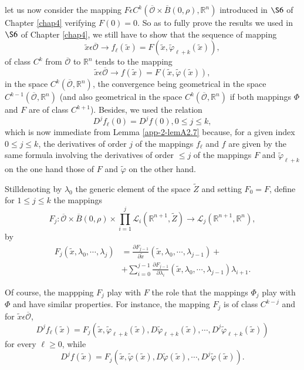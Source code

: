 let us now consider the mapping $F \epsilon C^{k}
(\overline{\mathscr{O}} \times \overline{B}(0, \rho), \mathbb{R}^{n})$
introduced in $\S 6$ of Chapter \ref{chap4} verifying $F(0) = 0$. So
as to fully prove the results we used in $\S 6$ of Chapter
\ref{chap4}, we still have to show that the sequence of mapping
$$
\widetilde{x} \epsilon \overline{\mathscr{O}} \to
f_{\ell}(\widetilde{x}) = F(\widetilde{x}, \widetilde{\varphi}_{\ell +
k}(\widetilde{x})),
$$
of class $C^{k}$ from $\overline{\mathscr{O}}$ to $\mathbb{R}^{n}$
tends to the mapping
$$
\widetilde{x} \epsilon \overline{\mathscr{O}} \to f(\widetilde{x}) =
F(\widetilde{x}, \widetilde{\varphi}(\widetilde{x})),
$$
in the space $C^{k}(\overline{\mathscr{O}}, \mathbb{R}^{n})$, the
convergence being geometrical in the space
$C^{k-1}(\overline{\mathscr{O}}, \mathbb{R}^{n})$ (and also
geometrical in the space $C^{k}(\overline{\mathscr{O}},
\mathbb{R}^{n})$ if both mappings $\Phi$ and $F$ are of class
$C^{k+1}$). Besides, we used the relation
$$
D^{j}f_{\ell}(0) = D^{j}f(0), 0 \leq j \leq k,
$$
which is now immediate from Lemma \ref{app-2-lemA2.7} because, for a given index $0
\leq j \leq k$, the derivatives of order $j$ of the mappings $f_{\ell}$
and $f$ are given by the same formula involving the derivatives of order
$\leq j$ of the mappings $F$ and $\widetilde{\varphi}_{\ell + k}$ on the
one hand those of $F$ and $\widetilde{\varphi}$ on the other hand.

Still\pageoriginale denoting by $\lambda_{0}$ the generic element of
the space $\widetilde{Z}$ and setting $F_{0} = F$, define for $1 \leq
j \leq k$ the mappings
$$ 
F_{j} : \overline{\mathscr{O}} \times \overline{B}(0, \rho) \times
\prod_{i=1}^{j} \mathscr{L}_{i} (\mathbb{R}^{n+1}, \widetilde{Z}) \to
\mathscr{L}_{j} (\mathbb{R}^{n+1}, \mathbb{R}^{n}),
$$
by
\begin{align*}
F_{j}(\widetilde{x}, \lambda_{0}, \cdots, \lambda_{j}) & =
\frac{\partial F_{j-1}}{\partial \widetilde{x}} (\widetilde{x},
\lambda_{0}, \cdots, \lambda_{j-1}) + \tag{A2.60}\label{app-2-eqA2.60}\\
& + \sum\limits_{i=0}^{j-1} \frac{\partial F_{j-1}}{\partial
  \lambda_{i}} (\widetilde{x}, \lambda_{0}, \cdots, \lambda_{j-1}) \lambda_{i+1}.
\end{align*}

Of course, the mappping $F_{j}$ play with $F$ the role that the mappings
$\Phi_{j}$ play with $\Phi$ and have similar properties. For instance,
the mapping $F_{j}$ is of class $C^{k-j}$ and for $\widetilde{x}
\epsilon \overline{\mathscr{O}}$,
\begin{equation*}
D^{j}f_{\ell}(\widetilde{x}) = F_{j}(\widetilde{x},
\widetilde{\varphi}_{\ell + k}(\widetilde{x}),
D\widetilde{\varphi}_{\ell + k} (\widetilde{x}), \cdots,
D^{j}\widetilde{\varphi}_{\ell + k}(\widetilde{x}))\tag{A2.61}\label{app-2-eqA2.61}
\end{equation*}
for every $\ell \geq 0$, while
\begin{equation*}
D^{j}f(\widetilde{x}) = F_{j}(\widetilde{x},
\widetilde{\varphi}(\widetilde{x}),
D\widetilde{\varphi}(\widetilde{x}), \cdots,
D^{j}\widetilde{\varphi}(\widetilde{x})).\tag{A2.62} \label{app-2-eqA2.62}
\end{equation*}

